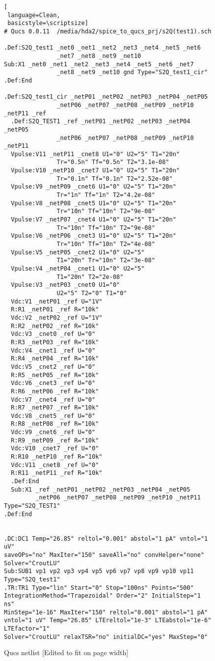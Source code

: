 \begin{figure}
  \centering
\begin{lstlisting}[
 language=Clean, 
 basicstyle=\scriptsize]
# Qucs 0.0.11  /media/hda2/spice_to_qucs_prj/s2Q(test1).sch

.Def:S2Q_test1 _net0 _net1 _net2 _net3 _net4 _net5 _net6 
               _net7 _net8 _net9 _net10
Sub:X1 _net0 _net1 _net2 _net3 _net4 _net5 _net6 _net7 
               _net8 _net9 _net10 gnd Type="S2Q_test1_cir"
.Def:End

.Def:S2Q_test1_cir _netP01 _netP02 _netP03 _netP04 _netP05 
               _netP06 _netP07 _netP08 _netP09 _netP10 _netP11 _ref
  .Def:S2Q_TEST1 _ref _netP01 _netP02 _netP03 _netP04 _netP05 
               _netP06 _netP07 _netP08 _netP09 _netP10 _netP11
  Vpulse:V11 _netP11 _cnet8 U1="0" U2="5" T1="20n" 
               Tr="0.5n" Tf="0.5n" T2="3.1e-08"
  Vpulse:V10 _netP10 _cnet7 U1="0" U2="5" T1="20n" 
               Tr="0.1n" Tf="0.1n" T2="2.52e-08"
  Vpulse:V9 _netP09 _cnet6 U1="0" U2="5" T1="20n" 
               Tr="1n" Tf="1n" T2="4.2e-08"
  Vpulse:V8 _netP08 _cnet5 U1="0" U2="5" T1="20n" 
               Tr="10n" Tf="10n" T2="9e-08"
  Vpulse:V7 _netP07 _cnet4 U1="0" U2="5" T1="20n" 
               Tr="10n" Tf="10n" T2="9e-08"
  Vpulse:V6 _netP06 _cnet3 U1="0" U2="5" T1="20n" 
               Tr="10n" Tf="10n" T2="4e-08"
  Vpulse:V5 _netP05 _cnet2 U1="0" U2="5" 
               T1="20n" Tr="10n" T2="3e-08"
  Vpulse:V4 _netP04 _cnet1 U1="0" U2="5" 
               T1="20n" T2="2e-08"
  Vpulse:V3 _netP03 _cnet0 U1="0" 
               U2="5" T2="0" T1="0"
  Vdc:V1 _netP01 _ref U="1V"
  R:R1 _netP01 _ref R="10k"
  Vdc:V2 _netP02 _ref U="1V"
  R:R2 _netP02 _ref R="10k"
  Vdc:V3 _cnet0 _ref U="0"
  R:R3 _netP03 _ref R="10k"
  Vdc:V4 _cnet1 _ref U="0"
  R:R4 _netP04 _ref R="10k"
  Vdc:V5 _cnet2 _ref U="0"
  R:R5 _netP05 _ref R="10k"
  Vdc:V6 _cnet3 _ref U="0"
  R:R6 _netP06 _ref R="10k"
  Vdc:V7 _cnet4 _ref U="0"
  R:R7 _netP07 _ref R="10k"
  Vdc:V8 _cnet5 _ref U="0"
  R:R8 _netP08 _ref R="10k"
  Vdc:V9 _cnet6 _ref U="0"
  R:R9 _netP09 _ref R="10k"
  Vdc:V10 _cnet7 _ref U="0"
  R:R10 _netP10 _ref R="10k"
  Vdc:V11 _cnet8 _ref U="0"
  R:R11 _netP11 _ref R="10k"
  .Def:End
  Sub:X1 _ref _netP01 _netP02 _netP03 _netP04 _netP05 
         _netP06 _netP07 _netP08 _netP09 _netP10 _netP11 Type="S2Q_TEST1"
.Def:End


.DC:DC1 Temp="26.85" reltol="0.001" abstol="1 pA" vntol="1 uV" 
saveOPs="no" MaxIter="150" saveAll="no" convHelper="none" Solver="CroutLU"
Sub:SUB1 vp1 vp2 vp3 vp4 vp5 vp6 vp7 vp8 vp9 vp10 vp11 Type="S2Q_test1"
.TR:TR1 Type="lin" Start="0" Stop="100ns" Points="500" 
IntegrationMethod="Trapezoidal" Order="2" InitialStep="1 ns" 
MinStep="1e-16" MaxIter="150" reltol="0.001" abstol="1 pA"  
vntol="1 uV" Temp="26.85" LTEreltol="1e-3" LTEabstol="1e-6" LTEfactor="1" 
Solver="CroutLU" relaxTSR="no" initialDC="yes" MaxStep="0"

\end{lstlisting}
 \caption{Qucs netlist [Edited to fit on page width]}
  \label{fig:S2Qtest1_2}
\end{figure} 

